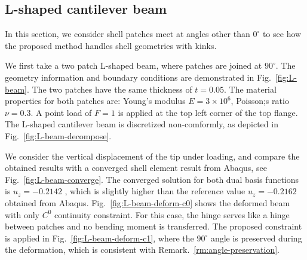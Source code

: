 \documentclass[preprint,12pt]{elsarticle}
\theoremstyle{remark}
\begin{document}
\subsection{L-shaped cantilever beam}
In this section, we consider shell patches meet at angles other than $0^{\circ}$ to see how the proposed method handles shell geometries with kinks. \par

We first take a two patch L-shaped beam, where patches are joined at $90^{\circ}$. The geometry information and boundary conditions are demonstrated in Fig.~\ref{fig:L-beam}. The two patches have the same thickness of $t = 0.05$. The material properties for both patches are: Young’s modulus $E = 3\times10^6$, Poisson;s ratio $\nu = 0.3$. A point load of $F=1$ is applied at the top left corner of the top flange. The L-shaped cantilever beam is discretized non-comformly, as depicted in Fig.~\ref{fig:L-beam-decompose}.\par

We consider the vertical displacement of the tip under loading, and compare the obtained results with a converged shell element result from Abaqus, see Fig.~\ref{fig:L-beam-converge}. The converged solution for both dual basis functions is $u_z = -0.2142$ , which is slightly higher than the reference value $u_z = -0.2162$ obtained from Abaqus. Fig.~\ref{fig:L-beam-deform-c0} shows the deformed beam with only $C^0$ continuity constraint. For this case, the hinge serves like a hinge between patches and no bending moment is transferred. The proposed constraint is applied in Fig.~\ref{fig:L-beam-deform-c1}, where the $90^{\circ}$ angle is preserved during the deformation, which is consistent with Remark.~\ref{rm:angle-preservation}. \par
\end{document}
